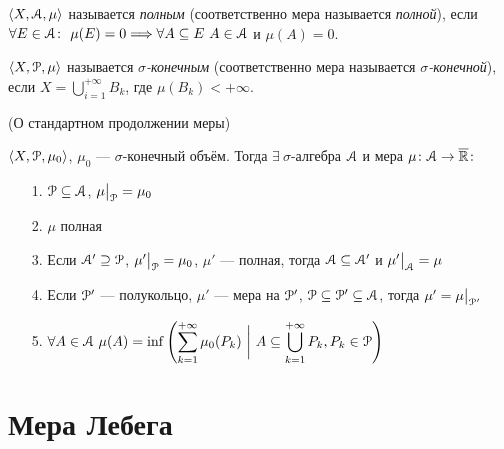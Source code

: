 \begin{definition}
    $\langle X, \mathcal{A}, \mu \rangle$ называется \textit{полным} (соответственно мера
    называется \textit{полной}), если $\forall E \in \mathcal{A} \colon~ \mu(E) = 0 \Longrightarrow
    \forall A \subseteq E~ A \in \mathcal{A}$ и $\mu(A) = 0$.
\end{definition}

\begin{definition}
    $\langle X, \mathcal{P}, \mu \rangle$ называется \textit{$\sigma$-конечным} (соответственно
    мера называется \textit{$\sigma$-конечной}), если $\displaystyle
    X = \bigcup_{i = 1}^{+\infty}{B_k}$, где $\mu(B_k) < +\infty$.
\end{definition}

\begin{theorem}(О стандартном продолжении меры)

    $\langle X, \mathcal{P}, \mu_0 \rangle$, $\mu_0$ --- $\sigma$-конечный объём. Тогда
    $\exists~ \sigma$-алгебра $\mathcal{A}$ и мера $\mu \colon \mathcal{A} \to \overline{\mathbb{R}}\colon$
    \begin{itemize}
        \item[1.] $\mathcal{P} \subseteq \mathcal{A}$, $\mu\big|_{\mathcal{P}} = \mu_0$
        \item[2.] $\mu$ полная
        \item[3.] Если $\mathcal{A}' \supseteq \mathcal{P}$, $\mu'\big|_{\mathcal{P}} = \mu_0$,
        $\mu'$ --- полная, тогда $\mathcal{A} \subseteq \mathcal{A}'$ и $\mu'\big|_{\mathcal{A}} = \mu$
        \item[4.] Если $\mathcal{P}'$ --- полукольцо, $\mu'$ --- мера на $\mathcal{P}'$,
        $\mathcal{P} \subseteq \mathcal{P}' \subseteq \mathcal{A}$, тогда $\mu' = \mu\big|_{\mathcal{P}'}$
        \item[5.] $\displaystyle \forall A \in \mathcal{A}~ \mu(A) =
        \inf{\left(\sum_{k = 1}^{+\infty}{\mu_0(P_k)} ~\bigg|~ A \subseteq \bigcup_{k = 1}
        ^{+\infty}{P_k}, P_k \in \mathcal{P}\right)}$
    \end{itemize}
\end{theorem}

\section{Мера Лебега}

